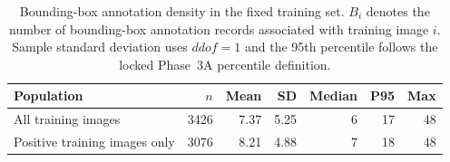 \begin{table}[htbp]
\centering
\caption{Bounding-box annotation density in the fixed training set. $B_i$ denotes the number of bounding-box annotation records associated with training image $i$. Sample standard deviation uses $ddof=1$ and the 95th percentile follows the locked Phase~3A percentile definition.}
\label{tab:supp_bbox_density}
\small
\setlength{\tabcolsep}{5pt}
\renewcommand{\arraystretch}{1.05}
\begin{tabular}{lrrrrrr}
\toprule
\textbf{Population} & \textbf{$n$} & \textbf{Mean} & \textbf{SD} & \textbf{Median} & \textbf{P95} & \textbf{Max} \\
\midrule
All training images & 3426 & 7.37 & 5.25 & 6 & 17 & 48 \\
Positive training images only & 3076 & 8.21 & 4.88 & 7 & 18 & 48 \\
\bottomrule
\end{tabular}
\end{table}
